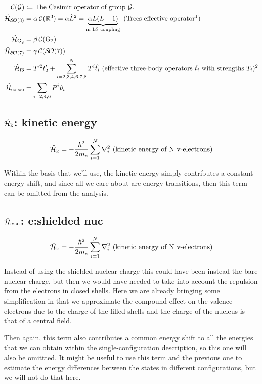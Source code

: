 \documentclass{article}
\begin{document}
\begin{align}
	\casimir{\anyGroup} &\DEF \text{The Casimir operator of group $\anyGroup$.}\\
	\hamTreesSymbol &= \alpha\casimir{\mathbb{R}^3} = \alpha \op{L}^2 = \underbrace{\alpha L (L+1)}_\text{in LS coupling} \text{ (Trees effective operator\footnotemark)} \\
	\hamGTwoSymbol      &= \beta\casimir{\text{G}_2} \\
	\hamSOSevenSymbol   &= \gamma\casimir{\SO{7}} \\
	\ham_\text{f3} &= T'^{2}t'_2 + \hamEffectiveThreeBody \text{ (effective three-body operators $\op{t_i}$ with strengths $T_i$)\footnotemark} \\
	\hamECSOSymbol &= \hamECSO
\end{align}

\subsection{$\hat{\mathcal{H}}_\text{k}$: kinetic energy}

\begin{equation}
    \hat{\mathcal{H}}_\text{k} = -\frac{\hbar^2}{2m_e}\sum_{i=1}^N \nabla_i^2 \text{ (kinetic energy of N v-electrons)}
\end{equation}

Within the basis that we'll use, the kinetic energy simply contributes a constant energy shift, and since all we care about are energy transitions, then this term can be omitted from the analysis.

\subsection{$\hat{\mathcal{H}}_\text{e:sn}$: e:shielded nuc}

\begin{equation}
\hat{\mathcal{H}}_\text{k} = -\frac{\hbar^2}{2m_e}\sum_{i=1}^N \nabla_i^2 \text{ (kinetic energy of N v-electrons)}
\end{equation}

Instead of using the shielded nuclear charge this could have been instead the bare nuclear charge, but then we would have needed to take into account the repulsion from the electrons in closed shells. Here we are already bringing some simplification in that we approximate the compound effect on the valence electrons due to the charge of the filled shells and the charge of the nucleus is that of a central field. 

Then again, this term also contributes a common energy shift to all the energies that we can obtain within the single-configuration description, so this one will also be omittted. It might be useful to use this term and the previous one to estimate the energy differences between the states in different configurations, but we will not do that here.
\end{document}
